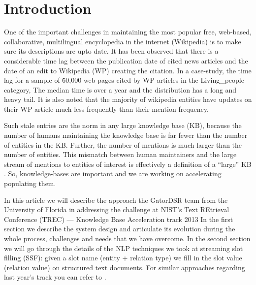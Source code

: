 
\section{Introduction}

One of the important challenges in maintaining the most popular free, web-based, collaborative, multilingual encyclopedia in the internet (Wikipedia) is to make sure its descriptions are upto date. It has been observed that there is a considerable time lag between the publication date of cited news articles and the date of an edit to Wikipedia (WP) creating the citation. In a case-study, the time lag for a sample of \~60,000 web pages cited by WP articles in the Living\_people category, The median time is over a year and the distribution has a long and heavy tail\cite{JFrank12}. It is also noted that the majority of wikipedia entities have updates on their WP article much less frequently than their mention frequency.

Such stale entries are the norm in any large knowledge base (KB), because the number of humans maintaining the knowledge base is far fewer than the number of entities in the KB. Further, the number of mentions is much larger than the number of entities. This mismatch between human maintainers and the large stream of mentions to entities of interest is effectively a definition of a ``large'' KB \cite{JFrank12}. So, knowledge-bases are important and we are working on accelerating populating them.

In this article we will describe the approach the GatorDSR team from the 
University of Florida in addressing the challenge at NIST’s Text 
REtrieval Conference (TREC) --- Knowledge Base Acceleration track 2013 
In the first section we describe 
the system design and articulate its evolution during the whole process, 
challenges and needs that we have overcome. In the second section we will go 
through the details of the NLP techniques we took at streaming slot filling
(SSF): given a slot name (entity + relation type) we fill in the slot value
(relation value) on structured text documents. For similar approaches regarding last year's track you can refer to \cite{ji2011knowledge}.

